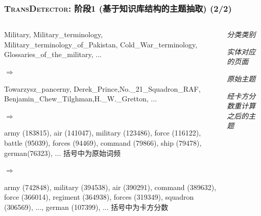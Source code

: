 \begin{frame}
\frametitle{\noindent \textsc{TransDetector}: 阶段1 (基于知识库结构的主题抽取) (2/2)}	
\begin{columns}
\begin{column}{0.78\paperwidth}
\footnotesize
Military, Military\_terminology, Military\_terminology\_of\_Pakistan, Cold\_War\_terminology, Glossaries\_of\_the\_military, ...

{\color{red}$\Rightarrow$}

{\footnotesize\color{red}Towarzysz\_pancerny, Derek\_Prince,No.\_21\_Squadron\_RAF,
Benjamin\_Chew\_Tilghman,H.\_W.\_Gretton, ...}

{\color{blue}$\Rightarrow$}

{\color{blue}army (183815), air (141047), military (123486), force (116122), battle (95039), forces (94469), command (79866), ship (79478), german(76323), ... 括号中为原始词频}

{\color{blue}$\Rightarrow$}

{\color{blue}army (742848), military (394538), air (390291), command (389632), 
force (366014), 
regiment (364938), 
forces (319349), 
squadron (306569), ..., german (107399), ... 括号中为卡方分数}
\end{column}

\begin{column}{0.2\paperwidth}
	{\color{black}\textit{分类类别}}

	\vspace{5mm}
	{\color{red}\textit{实体对应的页面}}

	\vspace{5mm}
	{\color{blue}\textit{原始主题}}

	\vspace{9mm}
	{\color{blue}\textit{经卡方分数重计算之后的主题}}

\end{column}


\end{columns}



\end{frame}


